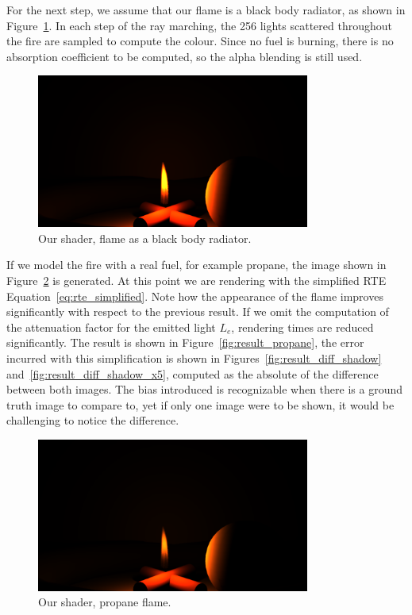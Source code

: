 For the next step, we assume that our flame is a black body radiator, as shown in Figure~\ref{fig:result_blackbody}.
In each step of the ray marching, the 256 lights scattered throughout the fire are sampled to compute the colour.
Since no fuel is burning, there is no absorption coefficient to be computed, so the alpha blending is still used.

\begin{figure}[htbp]
	\centering
	\includegraphics[width=0.8\textwidth, trim={8cm 0 8cm 10cm}, clip]{img/result_blackbody}
	\caption{Our shader, flame as a black body radiator.}
	\label{fig:result_blackbody}
\end{figure}

If we model the fire with a real fuel, for example propane, the image shown in Figure~\ref{fig:result_propane_shadows} is generated.
At this point we are rendering with the simplified RTE Equation~\ref{eq:rte_simplified}.
Note how the appearance of the flame improves significantly with respect to the previous result.
If we omit the computation of the attenuation factor for the emitted light $L_e$, rendering times are reduced significantly.
The result is shown in Figure~\ref{fig:result_propane}, the error incurred with this simplification is shown in Figures~\ref{fig:result_diff_shadow} and~\ref{fig:result_diff_shadow_x5}, computed as the absolute of the difference between both images.
The bias introduced is recognizable when there is a ground truth image to compare to, yet if only one image were to be shown, it would be challenging to notice the difference. 

\begin{figure}[htbp]
	\centering
	\includegraphics[width=0.8\textwidth, trim={8cm 0 8cm 10cm}, clip]{img/result_propane_shadows}
	\caption{Our shader, propane flame.}
	\label{fig:result_propane_shadows}
\end{figure}

